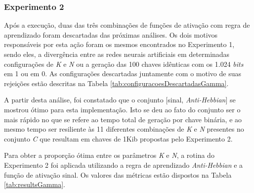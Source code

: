 \documentclass[12pt]{article}
\newcommand{\bits}{\textit{bits}\xspace}
\begin{document}
            \subsubsection{Experimento 2}
            \label{subsubsec:experimentoGamma}
            
                Após a execução, duas das três combinações de funções de ativação com regra de aprendizado foram descartadas das próximas análises. Os dois motivos responsáveis por esta ação foram os mesmos encontrados no Experimento 1, sendo eles, a divergência entre as redes neurais artificiais em determinadas configurações de \textit{K} e \textit{N} ou a geração das 100 chaves idênticas com os 1.024 \bits em 1 ou em 0. As configurações descartadas juntamente com o motivo de suas rejeições estão descritas na Tabela \ref{tab:configuracoesDescartadasGamma}.
                
                
                
                A partir desta análise, foi constatado que o conjunto [sinal, \textit{Anti-Hebbian}] se mostrou ótimo para esta implementação. Isto se deu ao fato do conjunto ser o mais rápido no que se refere ao tempo total de geração por chave binária, e ao mesmo tempo ser resiliente às 11 diferentes combinações de \textit{K} e \textit{N} presentes no conjunto \textit{C} que resultam em chaves de 1Kib propostas pelo Experimento 2.
                
                Para obter a proporção ótima entre os parâmetros \textit{K} e \textit{N}, a rotina do Experimento 2 foi aplicada utilizando a regra de aprendizado \textit{Anti-Hebbian} e a função de ativação sinal. Os valores das métricas estão dispostos na Tabela \ref{tab:resultsGamma}.
                
                
                
                
\end{document}
